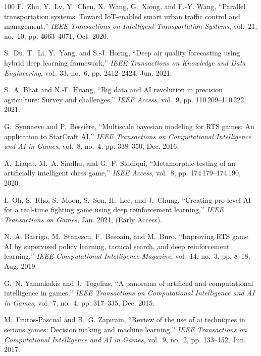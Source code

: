 \documentclass[journal]{IEEEtran}
\begin{document}
\begin{thebibliography}{100}
	F.~Zhu, Y.~Lv, Y.~Chen, X.~Wang, G.~Xiong, and F.-Y. Wang, ``Parallel
	transportation systems: Toward {IoT}-enabled smart urban traffic control and
	management,'' \emph{IEEE Transactions on Intelligent Transportation Systems},
	vol.~21, no.~10, pp. 4063--4071, Oct. 2020.
	
	S.~Du, T.~Li, Y.~Yang, and S.-J. Horng, ``Deep air quality forecasting using
	hybrid deep learning framework,'' \emph{IEEE Transactions on Knowledge and
		Data Engineering}, vol.~33, no.~6, pp. 2412--2424, Jun. 2021.
	
	S.~A. Bhat and N.-F. Huang, ``Big data and {AI} revolution in precision
	agriculture: Survey and challenges,'' \emph{IEEE Access}, vol.~9, pp.
	110\,209--110\,222, 2021.
	
	G.~Synnaeve and P.~Bessière, ``Multiscale bayesian modeling for {RTS} games:
	An application to {StarCraft} {AI},'' \emph{IEEE Transactions on
		Computational Intelligence and AI in Games}, vol.~8, no.~4, pp. 338--350,
	Dec. 2016.
	
	A.~Liaqat, M.~A. Sindhu, and G.~F. Siddiqui, ``Metamorphic testing of an
	artificially intelligent chess game,'' \emph{IEEE Access}, vol.~8, pp.
	174\,179--174\,190, 2020.
	
	I.~Oh, S.~Rho, S.~Moon, S.~Son, H.~Lee, and J.~Chung, ``Creating pro-level {AI}
	for a real-time fighting game using deep reinforcement learning,'' \emph{IEEE
		Transactions on Games}, Jan. 2021, {(Early Access)}.
	
	N.~A. Barriga, M.~Stanescu, F.~Besoain, and M.~Buro, ``Improving {RTS} game
	{AI} by supervised policy learning, tactical search, and deep reinforcement
	learning,'' \emph{IEEE Computational Intelligence Magazine}, vol.~14, no.~3,
	pp. 8--18, Aug. 2019.
	
	G.~N. Yannakakis and J.~Togelius, ``A panorama of artificial and computational
	intelligence in games,'' \emph{IEEE Transactions on Computational
		Intelligence and AI in Games}, vol.~7, no.~4, pp. 317--335, Dec. 2015.
	
	M.~Frutos-Pascual and B.~G. Zapirain, ``Review of the use of ai techniques in
	serious games: Decision making and machine learning,'' \emph{IEEE
		Transactions on Computational Intelligence and AI in Games}, vol.~9, no.~2,
	pp. 133--152, Jun. 2017.
	

\end{thebibliography}
\end{document}
